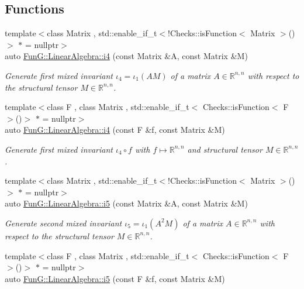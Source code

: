 \subsection*{Functions}
\begin{DoxyCompactItemize}
\item 
{\footnotesize template$<$class Matrix , std\-::enable\-\_\-if\-\_\-t$<$!\-Checks\-::is\-Function$<$ Matrix $>$()$>$ $\ast$  = nullptr$>$ }\\auto \hyperlink{group__InvariantGroup_ga1898785172ecce11af0c27e54d555009}{Fun\-G\-::\-Linear\-Algebra\-::i4} (const Matrix \&A, const Matrix \&M)
\begin{DoxyCompactList}\small\item\em Generate first mixed invariant $ \iota_4=\iota_1(AM) $ of a matrix $A\in\mathbb{R}^{n,n}$ with respect to the structural tensor $M\in\mathbb{R}^{n,n}$. \end{DoxyCompactList}\item 
{\footnotesize template$<$class F , class Matrix , std\-::enable\-\_\-if\-\_\-t$<$ Checks\-::is\-Function$<$ F $>$()$>$ $\ast$  = nullptr$>$ }\\auto \hyperlink{group__InvariantGroup_ga0df96cdb1e4b8b5a040f2adc97c51100}{Fun\-G\-::\-Linear\-Algebra\-::i4} (const F \&f, const Matrix \&M)
\begin{DoxyCompactList}\small\item\em Generate first mixed invariant $ \iota_4\circ f $ with $f\mapsto\mathbb{R}^{n,n}$ and structural tensor $M\in\mathbb{R}^{n,n}$. \end{DoxyCompactList}\item 
{\footnotesize template$<$class Matrix , std\-::enable\-\_\-if\-\_\-t$<$!\-Checks\-::is\-Function$<$ Matrix $>$()$>$ $\ast$  = nullptr$>$ }\\auto \hyperlink{group__InvariantGroup_gabedc42182203d883278e29fd16b355a0}{Fun\-G\-::\-Linear\-Algebra\-::i5} (const Matrix \&A, const Matrix \&M)
\begin{DoxyCompactList}\small\item\em Generate second mixed invariant $ \iota_5=\iota_1(A^2M) $ of a matrix $A\in\mathbb{R}^{n,n}$ with respect to the structural tensor $M\in\mathbb{R}^{n,n}$. \end{DoxyCompactList}\item 
{\footnotesize template$<$class F , class Matrix , std\-::enable\-\_\-if\-\_\-t$<$ Checks\-::is\-Function$<$ F $>$()$>$ $\ast$  = nullptr$>$ }\\auto \hyperlink{group__InvariantGroup_gaed7e47c39d89f2b01e25c992da78b44d}{Fun\-G\-::\-Linear\-Algebra\-::i5} (const F \&f, const Matrix \&M)

\end{DoxyCompactItemize}
